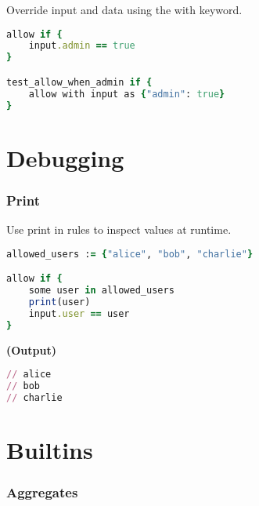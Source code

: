 \documentclass[twocolumn]{article}
\begin{document}
\footnotesize{Override input and data using the with keyword.}


\begin{lstlisting}[language=Ruby]
allow if {
	input.admin == true
}

test_allow_when_admin if {
	allow with input as {"admin": true}
}
\end{lstlisting}









\section*{Debugging  }




\vspace{-1em}
\subsubsection*{Print}


\footnotesize{Use print in rules to inspect values at runtime.}


\begin{lstlisting}[language=Ruby]
allowed_users := {"alice", "bob", "charlie"}

allow if {
	some user in allowed_users
	print(user)
	input.user == user
}
\end{lstlisting}



\textbf{\tiny{(Output)}}
\begin{lstlisting}[language=Ruby]
// alice
// bob
// charlie

\end{lstlisting}






\newpage


\section*{Builtins  }




\vspace{-1em}
\subsubsection*{Aggregates}
\end{document}
